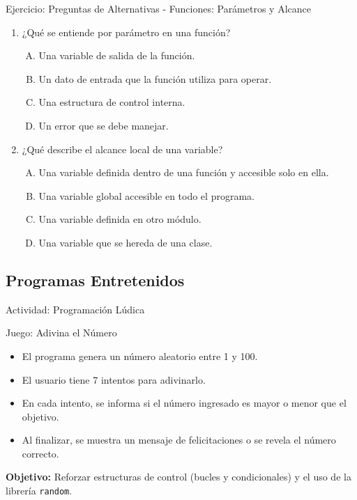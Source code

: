 \documentclass[10pt]{beamer}
\begin{document}
\begin{frame}{Ejercicio: Preguntas de Alternativas - Funciones: Parámetros y Alcance} 
    \begin{enumerate} 
        \item ¿Qué se entiende por parámetro en una función? 
        \begin{enumerate}[A)] 
            \item Una variable de salida de la función. 
            \item Un dato de entrada que la función utiliza para operar. 
            \item Una estructura de control interna. 
            \item Un error que se debe manejar. 
        \end{enumerate} 
        \item ¿Qué describe el alcance local de una variable? 
        \begin{enumerate}[A)] 
            \item Una variable definida dentro de una función y accesible solo en ella. 
            \item Una variable global accesible en todo el programa. 
            \item Una variable definida en otro módulo. 
            \item Una variable que se hereda de una clase. 
        \end{enumerate} 
    \end{enumerate}
\end{frame}


\subsection{Programas Entretenidos}
\begin{frame}[fragile]{Actividad: Programación Lúdica}
  \begin{block}{Juego: Adivina el Número}
    \begin{itemize}
      \item El programa genera un número aleatorio entre 1 y 100.
      \item El usuario tiene 7 intentos para adivinarlo.
      \item En cada intento, se informa si el número ingresado es mayor o menor que el objetivo.
      \item Al finalizar, se muestra un mensaje de felicitaciones o se revela el número correcto.
    \end{itemize}
  \end{block}
  \vspace{0.2cm}
  \textbf{Objetivo:} Reforzar estructuras de control (bucles y condicionales) y el uso de la librería \texttt{random}.
\end{frame}
\end{document}
